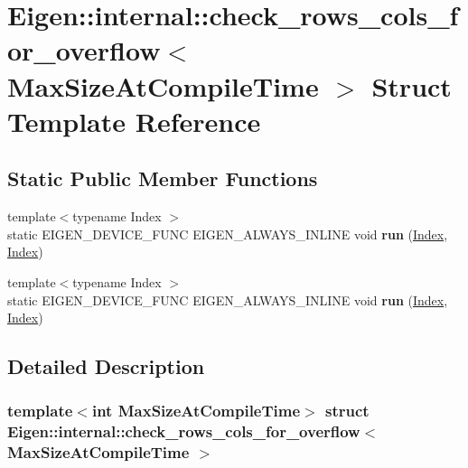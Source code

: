 \hypertarget{struct_eigen_1_1internal_1_1check__rows__cols__for__overflow}{}\section{Eigen\+:\+:internal\+:\+:check\+\_\+rows\+\_\+cols\+\_\+for\+\_\+overflow$<$ Max\+Size\+At\+Compile\+Time $>$ Struct Template Reference}
\label{struct_eigen_1_1internal_1_1check__rows__cols__for__overflow}
\subsection*{Static Public Member Functions}
\begin{DoxyCompactItemize}
\item 
\mbox{\label{struct_eigen_1_1internal_1_1check__rows__cols__for__overflow_a96aadd23e6335d10018576e81dec4443}} 
{\footnotesize template$<$typename Index $>$ }\\static E\+I\+G\+E\+N\+\_\+\+D\+E\+V\+I\+C\+E\+\_\+\+F\+U\+NC E\+I\+G\+E\+N\+\_\+\+A\+L\+W\+A\+Y\+S\+\_\+\+I\+N\+L\+I\+NE void {\bfseries run} (\hyperlink{namespace_eigen_a62e77e0933482dafde8fe197d9a2cfde}{Index}, \hyperlink{namespace_eigen_a62e77e0933482dafde8fe197d9a2cfde}{Index})
\item 
\mbox{\label{struct_eigen_1_1internal_1_1check__rows__cols__for__overflow_a96aadd23e6335d10018576e81dec4443}} 
{\footnotesize template$<$typename Index $>$ }\\static E\+I\+G\+E\+N\+\_\+\+D\+E\+V\+I\+C\+E\+\_\+\+F\+U\+NC E\+I\+G\+E\+N\+\_\+\+A\+L\+W\+A\+Y\+S\+\_\+\+I\+N\+L\+I\+NE void {\bfseries run} (\hyperlink{namespace_eigen_a62e77e0933482dafde8fe197d9a2cfde}{Index}, \hyperlink{namespace_eigen_a62e77e0933482dafde8fe197d9a2cfde}{Index})
\end{DoxyCompactItemize}


\subsection{Detailed Description}
\subsubsection*{template$<$int Max\+Size\+At\+Compile\+Time$>$\newline
struct Eigen\+::internal\+::check\+\_\+rows\+\_\+cols\+\_\+for\+\_\+overflow$<$ Max\+Size\+At\+Compile\+Time $>$}



